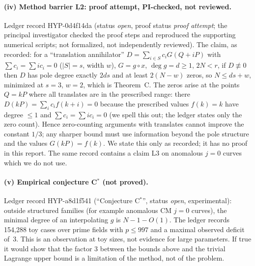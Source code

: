 \documentclass[11pt,a4paper]{article}
\theoremstyle{remark}
\begin{document}
\paragraph{(iv) Method barrier L2: proof attempt, PI-checked, not reviewed.}
Ledger record \mbox{HYP-0d4f14da} (status \emph{open}, proof status \emph{proof attempt}; the principal investigator checked the proof steps and reproduced the
supporting numerical scripts; not formalized, not independently reviewed). The claim, as recorded: for a ``translation annihilator''
$D=\sum_{i\in S}c_iG(Q+iP)$ with $\sum c_i=\sum ic_i=0$ ($|S|=s$, width $w$), $G=g\circ x$, $\deg g=d\ge1$, $2N<r$, if $D\not\equiv0$ then $D$ has pole degree exactly $2ds$ and at least $2(N-w)$ zeros, so $N\le ds+w$, minimized at $s=3$, $w=2$,
which is Theorem~C. The zeros arise at the points $Q=kP$ where all translates are in the prescribed range: there $D(kP)=\sum_ic_if(k+i)=0$ because the prescribed values $f(k)=k$ have degree $\le1$ and $\sum c_i=\sum ic_i=0$ (we spell this out; the ledger states only the zero count).
Hence zero-counting arguments with translates cannot improve the constant $1/3$; any sharper bound must use information beyond the pole structure and the values $G(kP)=f(k)$.
We state this only as recorded; it has no proof in this report. The same record contains a claim L3 on anomalous $j=0$ curves which we do not use.

\paragraph{(v) Empirical conjecture C$^*$ (not proved).}
Ledger record \mbox{HYP-a8d1f541} (``Conjecture C$^*$'', status \emph{open}, experimental): outside structured families (for example anomalous CM $j=0$ curves),
the minimal degree of an interpolating $g$ is $N-1-O(1)$. The ledger records 154{,}288 toy cases over prime fields with $p\le997$ and a maximal observed deficit of~$3$.
This is an observation at toy sizes, not evidence for large parameters. If true it would show that the factor $3$ between the bounds above and the trivial Lagrange upper bound is a limitation of the method, not of the problem.
\end{document}
